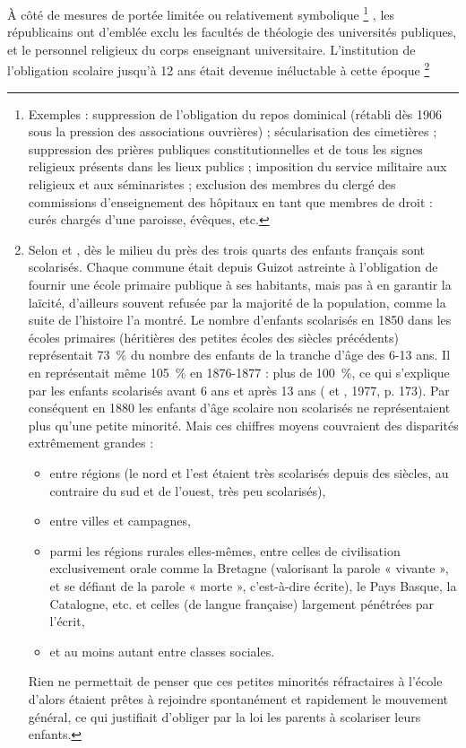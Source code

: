  À côté de mesures de portée limitée ou relativement symbolique%
\footnote{Exemples : suppression de l'obligation du repos dominical (rétabli dès 1906 sous la pression des associations ouvrières) ; sécularisation des cimetières ; suppression des prières publiques constitutionnelles et de tous les signes religieux présents dans les lieux publics ; imposition du service militaire aux religieux et aux séminaristes ; exclusion des membres du clergé des commissions d'enseignement des hôpitaux en tant que membres de droit : curés chargés d'une paroisse, évêques, etc.}%
, les républicains ont d'emblée exclu les facultés de théologie des universités publiques, et le personnel religieux du corps enseignant universitaire. L'institution de l'obligation scolaire jusqu'à 12 ans était devenue inéluctable à cette époque%
\footnote{Selon  et , dès le milieu du  près des trois quarts des enfants français sont scolarisés. Chaque commune était depuis Guizot astreinte à l'obligation de fournir une école primaire publique à ses habitants, mais pas à en garantir la laïcité, d'ailleurs souvent refusée par la majorité de la population, comme la suite de l'histoire l'a montré. Le nombre d'enfants scolarisés en 1850 dans les écoles primaires (héritières des petites écoles des siècles précédents) représentait 73~\% du nombre des enfants de la tranche d'âge des 6-13 ans. Il en représentait même 105~\% en 1876-1877 : plus de 100~\%, ce qui s'explique par les enfants scolarisés avant 6 ans et après 13 ans ( et , 1977, p. 173). Par conséquent en 1880 les enfants d'âge scolaire non scolarisés ne représentaient plus qu'une petite minorité. Mais ces chiffres moyens couvraient des disparités extrêmement grandes :
\begin{itemize}
\item entre régions (le nord et l'est étaient très scolarisés depuis des siècles, au contraire du sud et de l'ouest, très peu scolarisés),
\item entre villes et campagnes,
\item parmi les régions rurales elles-mêmes, entre celles de civilisation exclusivement orale comme la Bretagne (valorisant la parole « vivante », et se défiant de la parole « morte », c'est-à-dire écrite), le Pays Basque, la Catalogne, etc. et celles (de langue française) largement pénétrées par l'écrit,
\item et au moins autant entre classes sociales.
\end{itemize}

 Rien ne permettait de penser que ces petites minorités réfractaires à l'école d'alors étaient prêtes à rejoindre spontanément et rapidement le mouvement général, ce qui justifiait d'obliger par la loi les parents à scolariser leurs enfants.}%
